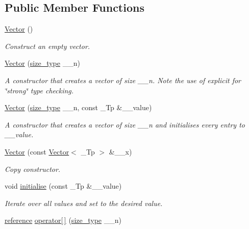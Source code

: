 \subsection*{Public Member Functions}
\begin{DoxyCompactItemize}
\item 
\hyperlink{classoomph_1_1Vector_a3ee293d1b770f0926ba350250bea37c7}{Vector} ()
\begin{DoxyCompactList}\small\item\em Construct an empty vector. \end{DoxyCompactList}\item 
\hyperlink{classoomph_1_1Vector_a996ae9557e2ee9491771eb586e032994}{Vector} (\hyperlink{classoomph_1_1Vector_a8ad2a43bd51f6bf2a981dd4e4e4247f5}{size\+\_\+type} \+\_\+\+\_\+n)
\begin{DoxyCompactList}\small\item\em A constructor that creates a vector of size \+\_\+\+\_\+n. Note the use of explicit for \char`\"{}strong\char`\"{} type checking. \end{DoxyCompactList}\item 
\hyperlink{classoomph_1_1Vector_a408f09400832e1584c832aff24b00966}{Vector} (\hyperlink{classoomph_1_1Vector_a8ad2a43bd51f6bf2a981dd4e4e4247f5}{size\+\_\+type} \+\_\+\+\_\+n, const \+\_\+\+Tp \&\+\_\+\+\_\+value)
\begin{DoxyCompactList}\small\item\em A constructor that creates a vector of size \+\_\+\+\_\+n and initialises every entry to \+\_\+\+\_\+value. \end{DoxyCompactList}\item 
\hyperlink{classoomph_1_1Vector_a6b3ef7c59dd463636129183dd64f7843}{Vector} (const \hyperlink{classoomph_1_1Vector}{Vector}$<$ \+\_\+\+Tp $>$ \&\+\_\+\+\_\+x)
\begin{DoxyCompactList}\small\item\em Copy constructor. \end{DoxyCompactList}\item 
void \hyperlink{classoomph_1_1Vector_ad526bb1acccf11b485ebe12c9cde44fd}{initialise} (const \+\_\+\+Tp \&\+\_\+\+\_\+value)
\begin{DoxyCompactList}\small\item\em Iterate over all values and set to the desired value. \end{DoxyCompactList}\item 
\hyperlink{classoomph_1_1Vector_a7bd8c89b884168f3ecc358acc501d356}{reference} \hyperlink{classoomph_1_1Vector_a7299888ed7f38cc2e891e1b50d47870d}{operator\mbox{[}$\,$\mbox{]}} (\hyperlink{classoomph_1_1Vector_a8ad2a43bd51f6bf2a981dd4e4e4247f5}{size\+\_\+type} \+\_\+\+\_\+n)

\end{DoxyCompactItemize}
